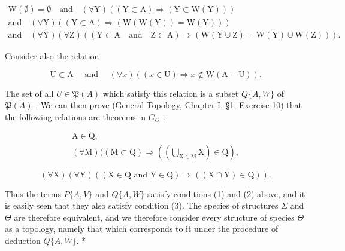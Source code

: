 \[
\begin{array}{c} \mathrm{W} (\emptyset) = \emptyset \quad \text {and} \quad (\forall \mathrm{Y}) ((\mathrm{Y} \subset \mathrm{A}) \Longrightarrow (\mathrm{Y} \subset \mathrm{W} (\mathrm{Y}))) \\ \text {and} \quad (\forall \mathrm{Y}) ((\mathrm{Y} \subset \mathrm{A}) \Longrightarrow (\mathrm{W} (\mathrm{W} (\mathrm{Y})) = \mathrm{W} (\mathrm{Y}))) \\ \text {and} \quad (\forall \mathrm{Y}) (\forall \mathrm{Z}) ((\mathrm{Y} \subset \mathrm{A} \quad \text {and} \quad \mathrm{Z} \subset \mathrm{A}) \Longrightarrow (\mathrm{W} (\mathrm{Y} \cup \mathrm{Z}) = \mathrm{W} (\mathrm{Y}) \cup \mathrm{W} (\mathrm{Z}))). \end{array}
\]

Consider also the relation

\[
\mathrm{U} \subset \mathrm{A} \quad \text { and } \quad (\forall x) ((x \in \mathrm{U}) \Longrightarrow x \notin \mathrm{W} (\mathrm{A} - \mathrm{U})).
\]

The set of all \(U \in \mathfrak{P}(A)\) which satisfy this relation is a subset \(Q\{A, W\}\) of \(\mathfrak{P}(A)\) . We can then prove (General Topology, Chapter I, §1, Exercise 10) that the following relations are theorems in \(G_{\Theta}\) :

\[
\begin{array}{c} \mathrm{A} \in \mathrm{Q}, \\ (\forall \mathrm{M}) ((\mathrm{M} \subset \mathrm{Q}) \Longrightarrow \left(\left(\bigcup_ {\mathrm{X} \in \mathrm{M}} \mathrm{X}\right) \in \mathrm{Q}\right), \end{array}
\]

\[
(\forall \mathrm{X}) (\forall \mathrm{Y}) ((\mathrm{X} \in \mathrm{Q} \text {   and   } \mathrm{Y} \in \mathrm{Q}) \Longrightarrow ((\mathrm{X} \cap \mathrm{Y}) \in \mathrm{Q})).
\]

Thus the terms \(P\{A,V\}\) and \(Q\{A,W\}\) satisfy conditions (1) and (2) above, and it is easily seen that they also satisfy condition (3). The species of structures \(\Sigma\) and \(\Theta\) are therefore equivalent, and we therefore consider every structure of species \(\Theta\) as a topology, namely that which corresponds to it under the procedure of deduction \(Q\{A,W\}\). *

